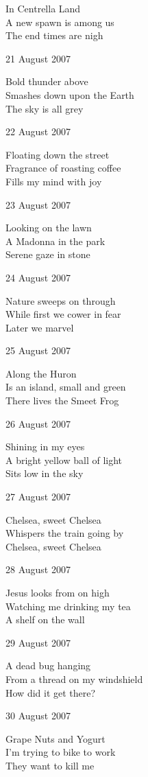 \documentclass[12pt]{article}
\begin{document}
In Centrella Land \\
A new spawn is among us \\
The end times are nigh

21 August 2007

Bold thunder above \\
Smashes down upon the Earth \\
The sky is all grey

22 August 2007

Floating down the street \\
Fragrance of roasting coffee \\
Fills my mind with joy

23 August 2007

Looking on the lawn \\
A Madonna in the park \\
Serene gaze in stone

24 August 2007

Nature sweeps on through \\
While first we cower in fear \\
Later we marvel

\newpage

25 August 2007 

Along the Huron \\
Is an island, small and green \\
There lives the Smeet Frog

26 August 2007

Shining in my eyes \\
A bright yellow ball of light \\
Sits low in the sky

27 August 2007

Chelsea, sweet Chelsea \\
Whispers the train going by \\
Chelsea, sweet Chelsea 

28 August 2007

Jesus looks from on high \\
Watching me drinking my tea \\
A shelf on the wall

29 August 2007

A dead bug hanging \\
From a thread on my windshield \\
How did it get there?

30 August 2007

Grape Nuts and Yogurt \\
I'm trying to bike to work \\
They want to kill me
\end{document}
